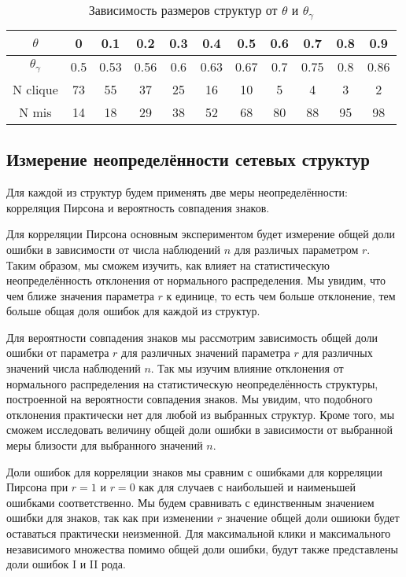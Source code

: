 \begin{table}[h!]
\centering
\begin{tabular}{ |c|c|c|c|c|c|c|c|c|c|c| } 
 \hline
 $\theta$ & 0 & 0.1 & 0.2 & 0.3 & 0.4 & 0.5 & 0.6 & 0.7 & 0.8 & 0.9 \\ 
 \hline
  $\theta_\gamma$ & 0.5 & 0.53 & 0.56 & 0.6 & 0.63 & 0.67 & 0.7 & 0.75 & 0.8 & 0.86 \\ 
 \hline
 N clique & 73 & 55 & 37 & 25 & 16 & 10 & 5 & 4 & 3 & 2\\ 
 \hline
 N mis & 14  & 18 & 29 & 38 & 52 & 68 & 80 & 88 & 95 & 98\\ 
 \hline
\end{tabular}
\caption{Зависимость размеров структур от $\theta$ и $\theta_\gamma$}
\label{table:mis_clique_size_sign}
\end{table}



\subsection{Измерение неопределённости сетевых структур}

Для каждой из структур будем применять две меры неопределённости: корреляция Пирсона и вероятность совпадения знаков.

Для корреляции Пирсона основным экспериментом будет измерение общей доли  ошибки в зависимости от числа наблюдений $n$ для различых параметром $r$. Таким образом, мы сможем изучить, как влияет на статистическую неопределённость отклонения от нормального распределения. Мы увидим, что чем ближе значения параметра $r$ к единице, то есть чем больше отклонение, тем больше общая доля ошибок для каждой из структур.

Для вероятности совпадения знаков мы рассмотрим зависимость  общей доли ошибки от параметра $r$ для различных значений параметра $r$ для различных значений числа наблюдений $n$. Так мы изучим влияние отклонения от нормального распределения на статистическую неопределённость структуры, построенной на вероятности совпадения знаков. Мы увидим, что подобного отклонения практически нет для любой из выбранных структур. Кроме того, мы сможем исследовать величину общей доли ошибки в зависимости от выбранной меры близости для выбранного значений $n$.

Доли ошибок для корреляции знаков мы сравним с ошибками для корреляции Пирсона при $r=1$ и $r=0$ как для случаев с наибольшей и наименьшей ошибками соответственно. Мы будем сравнивать с единственным значением ошибки для знаков, так как при изменении $r$ значение общей доли ошиюки будет оставаться практически неизменной. Для максимальной клики и максимального независимого множества помимо общей доли ошибки, будут также представлены доли ошибок I и II рода.

